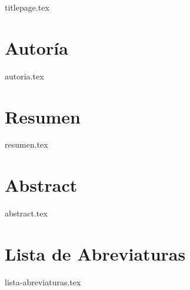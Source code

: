 \documentclass[11pt]{report}
\begin{document}
\renewcommand{\figurename}{Imagen}
\renewcommand{\listfigurename}{Lista de Imágenes}


\thispagestyle{empty}
{titlepage.tex}

\newpage

\chapter*{Autoría}


{autoria.tex}



\chapter*{Resumen}

{resumen.tex}


\chapter*{Abstract}

{abstract.tex}


\tableofcontents
\setcounter{page}{1}
\thispagestyle{plain}



\chapter*{Lista de Abreviaturas}

{lista-abreviaturas.tex}

\listoffigures
\thispagestyle{plain}

\listoftables
\thispagestyle{plain}
\end{document}

